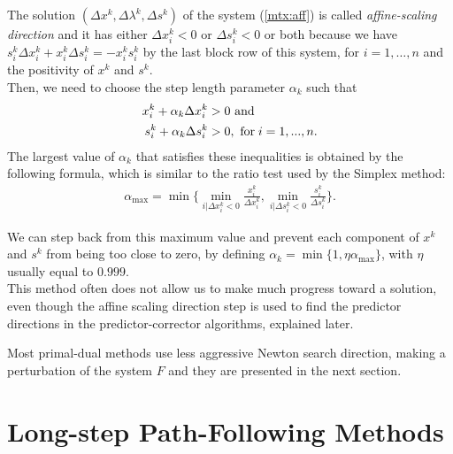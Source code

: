 \documentclass[a4paper,10 pt,titlepage,twoside]{report}
\theoremstyle{plain}
\theoremstyle{definition}
\theoremstyle{remark}
\begin{document}
The solution $\left(\Delta x^{k},\Delta\lambda^{k},\Delta s^{k}\right)$ of the system (\ref{mtx:aff}) is called \textit{affine-scaling direction} and it has either $\Delta x_{i}^{k}<0$ or $\Delta s_{i}^{k}<0$ or both because we have $s^{k}_{i}\Delta x^{k}_{i} + x^{k}_{i}\Delta s^{k}_{i} = - x^{k}_{i}s^{k}_{i}$ by the last block row of this system, for $i=1,\dots,n$ and the positivity of $x^{k}$ and $s^{k}$.\\
Then, we need to choose the step length parameter $\alpha_{k}$ such that
\begin{align*}
x^{k}_{i} + \alpha_{k} \Delta x^{k}_{i} &>0 \text{ and}\\
s^{k}_{i} + \alpha_{k} \Delta s^{k}_{i} &>0,\text{ for\;} i = 1,...,n. 
\end{align*}
The largest value of $\alpha_{k}$ that satisfies these inequalities is obtained by the following formula, which is similar to the ratio test used by the Simplex method:
\begin{align*}
\alpha_{\text{max}} = \min\biggl\{\min_{i|\Delta x^{k}_{i}<0}\frac{x^{k}_{i}}{\Delta x^{k}_{i}}, \min_{i|\Delta s^{k}_{i}<0}\frac{s^{k}_{i}}{\Delta s^{k}_{i}}\biggr\}.
\end{align*} 

We can step back from this maximum value and prevent each component of $x^{k}$ and $s^{k}$ from being too close to zero, by defining $\alpha_{k} = \min\{1,\eta\alpha_{\text{max}}\}$, with $\eta$ usually equal to $0.999$.\\
This method often does not allow us to make much progress toward a solution, even though the affine scaling direction step is used to find the predictor directions in the predictor-corrector algorithms, explained later.

Most primal-dual methods use less aggressive Newton search direction, making a perturbation of the system $F$ and they are presented in the next section.


\section{Long-step Path-Following Methods}
\end{document}
